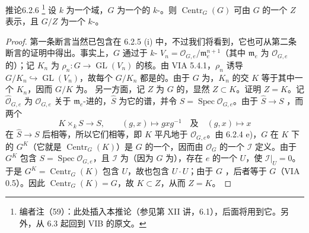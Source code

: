\begin{SGAresult}{推论}{6.2.6}
\footnote{编者注（59）：此处插入本推论（参见第 XII 讲，6.1），后面将用到它。另外，从 6.3 起回到 VIB 的原文。}
设 $k$ 为一个域，$G$ 为一个的 $k$-。则 $\operatorname{Centr}_G(G)$ 可由 $G$ 的一个 $Z$ 表示，且 $G/Z$ 为一个 $k$-。
\end{SGAresult}
\begin{proof}
第一条断言当然已包含在 6.2.5 (i) 中，不过我们将看到，它也可从第二条断言的证明中得出。事实上，$G$ 通过于 $k$- $V_n=\mathscr O_{G,e}/\mathfrak m_e^{n+1}$（其中 $\mathfrak m_e$ 为 $\mathscr O_{G,e}$ 的）；记 $K_n$ 为 $\rho_n:G\to\operatorname{GL}(V_n)$ 的核。由 VIA 5.4.1，$\rho_n$ 诱导 $G/K_n\hookrightarrow\operatorname{GL}(V_n)$，故每个 $G/K_n$ 都是的。由于 $G$ 为，$K_n$ 的交 $K$ 等于其中一个 $K_n$，因而 $G/K$ 为。
另一方面，记 $Z$ 为 $G$ 的，显然 $Z\subset K$。证明 $Z=K$。记 $\widehat{\mathscr O}_{G,e}$ 为 $\mathscr O_{G,e}$ 关于 $\mathfrak m_e$-进的，$\widehat S$ 为它的谱，并令 $S=\operatorname{Spec}\mathscr O_{G,e}$。由于 $\widehat S\to S$ ，而两个
\[
K\times_k S\longrightarrow S,\qquad
(g,x)\longmapsto gxg^{-1}\quad\text{及}\quad(g,x)\longmapsto x
\]
在 $\widehat S\to S$ 后相等，所以它们相等，即 $K$ 平凡地于 $\mathscr O_{G,e}$。由 6.2.4 e)，$G$ 在 $K$ 下的 $G^K$（它就是 $\operatorname{Centr}_G(K)$）是 $G$ 的一个，因而由 $\mathscr O_G$ 的一个 $\mathscr I$ 定义。由于 $G^K$ 包含 $S=\operatorname{Spec}\mathscr O_{G,e}$，且 $\mathscr I$ 为（因为 $G$ 为），存在 $e$ 的一个 $U$，使 $\mathscr I|_U=0$。于是 $G^K=\operatorname{Centr}_G(K)$ 包含 $U$，故也包含 $U\cdot U$；由于 $G$ ，后者等于 $G$（VIA 0.5）。因此 $\operatorname{Centr}_G(K)=G$，故 $K\subset Z$，从而 $Z=K$。
\end{proof}

